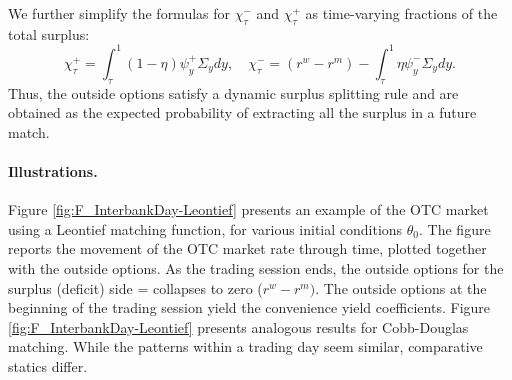 \documentclass[12pt,american,english,notitlepage]{article}
\begin{document}
We further simplify the formulas for $\chi_{\tau}^{-}$ and $\chi_{\tau}^{+}$
as time-varying fractions of the total surplus:
\begin{equation}
\label{eq:chi.surplusdensity}
\chi_{\tau}^{+}=\int_{\tau}^{1}\left(1-\eta\right)\psi_{y}^{+}\Sigma_{y}dy,\quad\chi_{\tau}^{-}=\left(r^{w}-r^{m}\right)-\int_{\tau}^{1}\eta\psi_{y}^{-}\Sigma_{y}dy.
\end{equation}
Thus, the outside options satisfy a dynamic surplus splitting rule
and are obtained as the expected probability of extracting all the
surplus in a future match.

\paragraph{Illustrations.}

Figure \ref{fig:F_InterbankDay-Leontief} presents an example of the
OTC market using a Leontief matching function, for various initial
conditions $\theta_{0}$. The figure reports the movement of the OTC
market rate through time, plotted together with the outside options.
As the trading session ends, the outside options for the surplus (deficit)
side = collapses to zero ($r^{w}-r^{m})$. The outside options at
the beginning of the trading session yield the convenience yield coefficients.
Figure \ref{fig:F_InterbankDay-Leontief} presents analogous results for Cobb-Douglas
matching. While the patterns within a trading day seem similar, comparative
statics differ.
\end{document}
